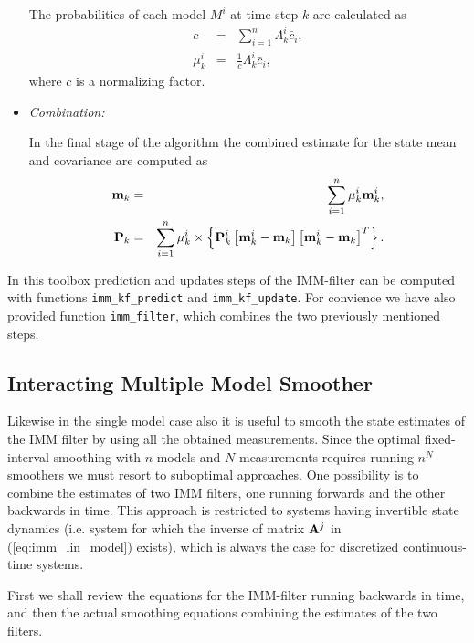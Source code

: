 \begin{itemize}
  The probabilities of each model $M^i$ at time step $k$ are
calculated as
  \begin{eqnarray}
  c & = & \sum_{i=1}^n \Lambda_k^i \bar{c}_i, \\ \label{eq:imm_c}
\mu_k^i & = & \frac{1}{c} \Lambda_k^i \bar{c}_i, \label{eq:imm_muk}
  \end{eqnarray}
  where $c$ is a normalizing factor.

\item {\em Combination:}
  
  In the final stage of the algorithm the combined estimate for the
state mean and covariance are computed as
  \begin{eqnarray}
  \mathbf{m}_k & = & \sum_{i=1}^n \mu_k^i \mathbf{m}_{k}^{i}, \\
  \mathbf{P}_k & = & \sum_{i=1}^n \mu_k^i \times \left\{\mathbf{P}_{k}^{i}
\left[\mathbf{m}_{k}^{i} -\mathbf{m}_k\right] \left[\mathbf{m}_{k}^{i}
-\mathbf{m}_k\right]^T\right\}.
  \end{eqnarray}
  
\end{itemize}

In this toolbox prediction and updates steps of the IMM-filter can be
computed with functions \texttt{imm\_kf\_predict} and
\texttt{imm\_kf\_update}. For convience we have also provided function
\texttt{imm\_filter}, which combines the two previously mentioned
steps.


\subsection{Interacting Multiple Model Smoother}

Likewise in the single model case also it is useful to smooth the
state estimates of the IMM filter by using all the obtained
measurements. Since the optimal fixed-interval smoothing with $n$
models and $N$ measurements requires running $n^N$ smoothers we must
resort to suboptimal approaches. One possibility \citep{Helmick+Blair+Hoffman:1995} is to
combine the estimates of two IMM filters, one running forwards and the
other backwards in time. This approach is restricted to systems having
invertible state dynamics (i.e. system for which the inverse of matrix
$\mathbf{A}^j$ in (\ref{eq:imm_lin_model}) exists), which is always the
case for discretized continuous-time systems.

First we shall review the equations for the IMM-filter running
backwards in time, and then the actual smoothing equations combining
the estimates of the two filters.

